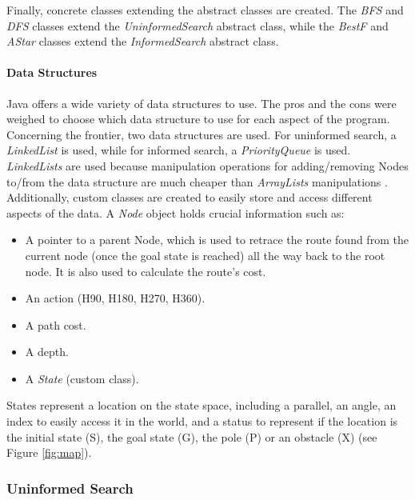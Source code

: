 \documentclass[letterpaper,12pt]{article}
\begin{document}
Finally, concrete classes extending the abstract classes are created. The \textit{BFS} and \textit{DFS} classes extend the \textit{UninformedSearch} abstract class, while the \textit{BestF} and \textit{AStar} classes extend the \textit{InformedSearch} abstract class.

\paragraph{Data Structures}

Java offers a wide variety of data structures to use. The pros and the cons were weighed to choose which data structure to use for each aspect of the program. Concerning the frontier, two data structures are used. For uninformed search, a \textit{LinkedList} is used, while for informed search, a \textit{PriorityQueue} is used. \textit{LinkedLists} are used because manipulation operations for adding/removing Nodes to/from the data structure are much cheaper than \textit{ArrayLists} manipulations \cite{diffLLAL}.\\

Additionally, custom classes are created to easily store and access different aspects of the data. A \textit{Node} object holds crucial information such as:
\begin{itemize}
    \item A pointer to a parent Node, which is used to retrace the route found from the current node (once the goal state is reached) all the way back to the root node. It is also used to calculate the route's cost.
    \item An action (H90, H180, H270, H360).
    \item A path cost.
    \item A depth.
    \item A \textit{State} (custom class).
\end{itemize}

States represent a location on the state space, including a parallel, an angle, an index to easily access it in the world, and a status to represent if the location is the initial state (S), the goal state (G), the pole (P) or an obstacle (X) (see Figure \ref{fig:map}).


\subsubsection{Uninformed Search}
\end{document}
